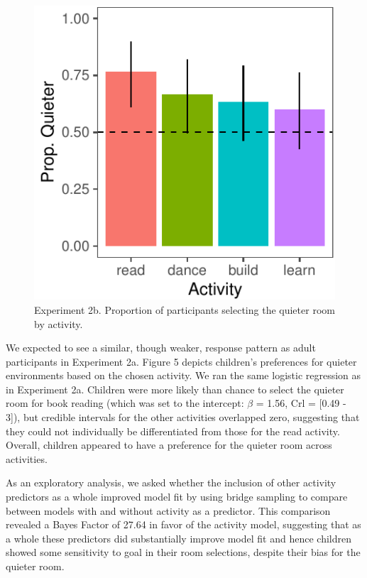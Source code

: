 \documentclass[10pt, letterpaper]{article}
\newenvironment{CodeChunk}{}{}
\begin{document}
\begin{CodeChunk}
\begin{figure}[t]

{\centering \includegraphics{figs/2b-bar-1} 

}

\caption[Experiment 2b]{Experiment 2b. Proportion of participants selecting the quieter room by activity.}\label{fig:2b-bar}
\end{figure}
\end{CodeChunk}

We expected to see a similar, though weaker, response pattern as adult
participants in Experiment 2a. Figure 5 depicts children's preferences
for quieter environments based on the chosen activity. We ran the same
logistic regression as in Experiment 2a. Children were more likely than
chance to select the quieter room for book reading (which was set to the
intercept: \(\beta\) = 1.56, Crl = {[}0.49 - 3{]}), but credible
intervals for the other activities overlapped zero, suggesting that they
could not individually be differentiated from those for the read
activity. Overall, children appeared to have a preference for the
quieter room across activities.

As an exploratory analysis, we asked whether the inclusion of other
activity predictors as a whole improved model fit by using bridge
sampling to compare between models with and without activity as a
predictor. This comparison revealed a Bayes Factor of 27.64 in favor of
the activity model, suggesting that as a whole these predictors did
substantially improve model fit and hence children showed some
sensitivity to goal in their room selections, despite their bias for the
quieter room.
\end{document}
